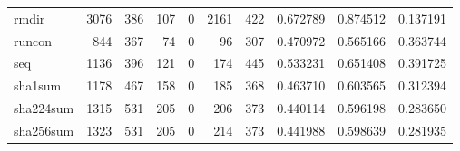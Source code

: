 \begin{tabular}{lrrrrrrrrr}
rmdir     &                                3076 &                                             386 &                                            107 &                                             0 &                                           2161 &                                          422 &                                           0.672789 &                               0.874512 &                             0.137191 \\
runcon    &                                 844 &                                             367 &                                             74 &                                             0 &                                             96 &                                          307 &                                           0.470972 &                               0.565166 &                             0.363744 \\
seq       &                                1136 &                                             396 &                                            121 &                                             0 &                                            174 &                                          445 &                                           0.533231 &                               0.651408 &                             0.391725 \\
sha1sum   &                                1178 &                                             467 &                                            158 &                                             0 &                                            185 &                                          368 &                                           0.463710 &                               0.603565 &                             0.312394 \\
sha224sum &                                1315 &                                             531 &                                            205 &                                             0 &                                            206 &                                          373 &                                           0.440114 &                               0.596198 &                             0.283650 \\
sha256sum &                                1323 &                                             531 &                                            205 &                                             0 &                                            214 &                                          373 &                                           0.441988 &                               0.598639 &                             0.281935 \\

\end{tabular}
